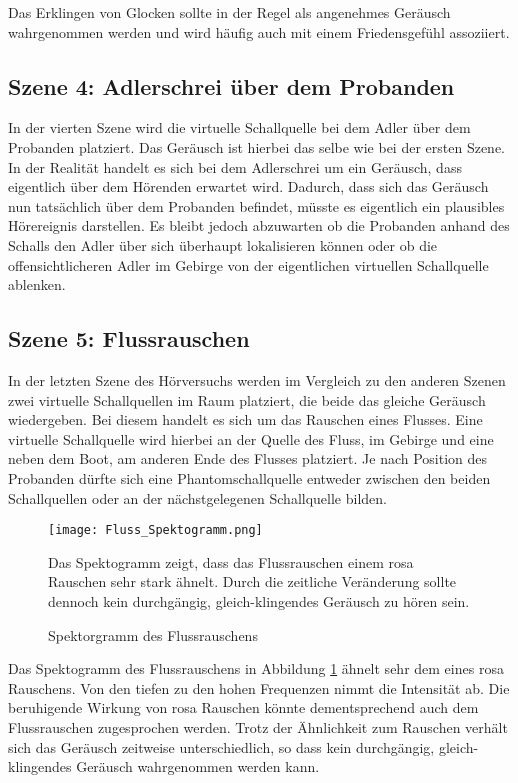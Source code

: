 Das Erklingen von Glocken sollte in der Regel als angenehmes Geräusch wahrgenommen werden und wird häufig auch mit einem Friedensgefühl assoziiert. 
\newpage

\subsection{Szene 4: Adlerschrei über dem Probanden}
In der vierten Szene wird die virtuelle Schallquelle bei dem Adler über dem Probanden platziert. Das Geräusch ist hierbei das selbe wie bei der ersten Szene. \\ 

In der Realität handelt es sich bei dem Adlerschrei um ein Geräusch, dass eigentlich über dem Hörenden erwartet wird. Dadurch, dass sich das Geräusch nun tatsächlich über dem Probanden befindet, müsste es eigentlich ein plausibles Hörereignis darstellen. Es bleibt jedoch abzuwarten ob die Probanden anhand des Schalls den Adler über sich überhaupt lokalisieren können oder ob die offensichtlicheren Adler im Gebirge von der eigentlichen virtuellen Schallquelle ablenken.  

\vspace*{40pt}
\subsection{Szene 5: Flussrauschen}
In der letzten Szene  des Hörversuchs werden im Vergleich zu den anderen Szenen zwei virtuelle Schallquellen im Raum platziert, die beide das gleiche Geräusch wiedergeben. Bei diesem handelt es sich um das Rauschen eines Flusses. Eine virtuelle Schallquelle wird hierbei an der Quelle des Fluss, im Gebirge und eine neben dem Boot, am anderen Ende des Flusses platziert. Je nach Position des Probanden dürfte sich eine Phantomschallquelle entweder zwischen den beiden Schallquellen  oder an der nächstgelegenen Schallquelle bilden. 

 \begin{figure}[H]
\centering
\texttt{[image: Fluss\_Spektogramm.png]}
\caption{Spektorgramm des Flussrauschens}
Das Spektogramm zeigt, dass das Flussrauschen einem rosa Rauschen sehr stark ähnelt. Durch die zeitliche Veränderung sollte dennoch kein durchgängig, gleich-klingendes Geräusch zu hören sein. 
\label{fig:Fluss_Spektogramm}
\end{figure} 

Das Spektogramm des Flussrauschens in Abbildung \ref{fig:Fluss_Spektogramm} ähnelt sehr dem eines rosa Rauschens. Von den tiefen zu den hohen Frequenzen nimmt die Intensität ab. Die beruhigende Wirkung von rosa Rauschen könnte dementsprechend  auch dem Flussrauschen zugesprochen werden. Trotz der Ähnlichkeit zum Rauschen verhält sich das Geräusch zeitweise unterschiedlich, so dass kein durchgängig, gleich-klingendes Geräusch wahrgenommen werden kann.  \\ 


